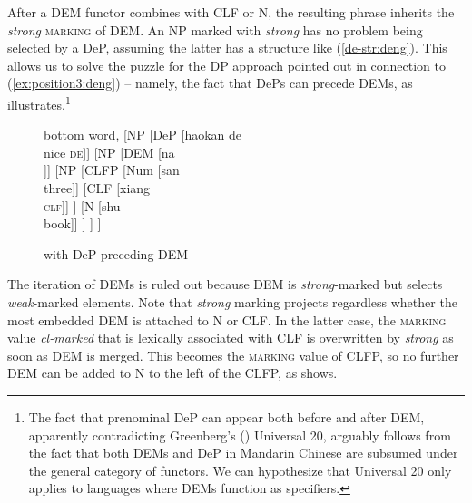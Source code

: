 \documentclass[output=paper,colorlinks,citecolor=brown]{langscibook}
\begin{document}
After a DEM  functor combines with CLF or N, the resulting phrase inherits the \textit{strong}  \textsc{marking} of DEM. An NP marked with \textit{strong} has no problem being selected by a DeP, assuming the latter has a structure like (\ref{de-str:deng}). This allows us to solve the puzzle for the DP approach pointed out in connection to (\ref{ex:position3:deng}) -- namely, the fact that DePs can precede DEMs, as  illustrates.\footnote{The fact that prenominal DeP can appear both before and after DEM, apparently contradicting Greenberg's (\citeyear{Greenberg63c}) Universal 20, arguably follows from the fact that both DEMs and DeP in Mandarin Chinese are subsumed under the general category of functors. We can hypothesize that Universal 20 only applies to languages where DEMs function as specifiers.} 

\begin{figure}
  \centering
			\begin{forest}
				bottom word,
				[NP
				[DeP [haokan de\\ nice \textsc{de}]]
				[NP
				[DEM [na \\ \textsc{}]]
				[NP
				[CLFP
				[Num [san \\ three]]
				[CLF [xiang \\ \textsc{clf}]]
				]
				[N]
				]
				]
				]
			\end{forest}
  \caption{ with DeP preceding DEM}
  \label{fig:de-dem:deng} 
\end{figure}

The iteration of DEMs is ruled out because DEM is \textit{strong}-marked but selects \textit{weak}-marked elements. Note that \textit{strong} marking projects regardless whether the most embedded DEM is attached to  N or CLF. In the latter case, the \textsc{marking} value \textit{cl-marked} that is lexically associated with CLF is overwritten by \textit{strong} as soon as DEM is merged. This becomes the \textsc{marking} value of CLFP, so no further DEM can be added to N to the left of the CLFP, as  shows. %
\end{document}
